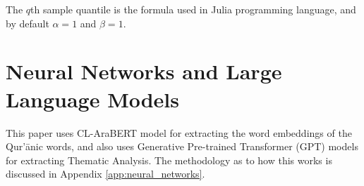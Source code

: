 \begin{remark}
    The $q$th sample quantile is the formula used in Julia programming language, and by default $\alpha=1$ and $\beta=1$.
\end{remark}

\section{Neural Networks and Large Language Models}
This paper uses CL-AraBERT model \cite{MALHAS2022103068} for extracting the word embeddings of the Qur'\=anic words, and also uses Generative Pre-trained Transformer (GPT) models \cite{radford2018improving} for extracting Thematic Analysis. The methodology as to how this works is discussed in Appendix \ref{app:neural_networks}.